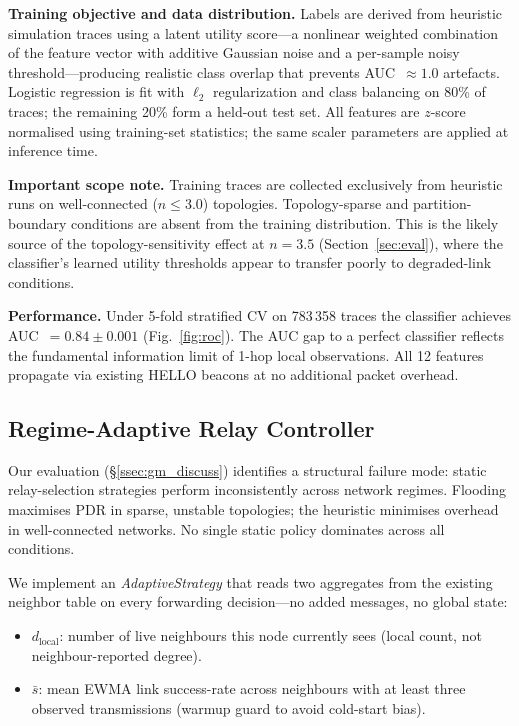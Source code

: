 \documentclass[conference]{IEEEtran}
\begin{document}
\textbf{Training objective and data distribution.}
Labels are derived from heuristic simulation traces using a latent utility
score---a nonlinear weighted combination of the feature vector with additive
Gaussian noise and a per-sample noisy threshold---producing realistic class
overlap that prevents AUC~$\approx 1.0$ artefacts.  Logistic regression is fit
with $\ell_2$ regularization and class balancing on 80\% of traces; the
remaining 20\% form a held-out test set.  All features are $z$-score normalised
using training-set statistics; the same scaler parameters are applied at
inference time.

\textbf{Important scope note.}  Training traces are collected exclusively from
heuristic runs on well-connected ($n \leq 3.0$) topologies.  Topology-sparse
and partition-boundary conditions are absent from the training distribution.
This is the likely source of the topology-sensitivity effect at $n=3.5$
(Section~\ref{sec:eval}), where the classifier's learned utility thresholds
appear to transfer poorly to degraded-link conditions.

\textbf{Performance.}
Under 5-fold stratified CV on 783\,358 traces the classifier achieves
AUC~$=0.84\pm0.001$ (Fig.~\ref{fig:roc}).  The AUC gap to a perfect classifier
reflects the fundamental information limit of 1-hop local observations.
All 12 features propagate via existing HELLO beacons at no additional packet
overhead.

\subsection{Regime-Adaptive Relay Controller}
\label{ssec:adaptive}
Our evaluation (§\ref{ssec:gm_discuss}) identifies a structural failure mode:
static relay-selection strategies perform inconsistently across network regimes.
Flooding maximises PDR in sparse, unstable topologies; the heuristic minimises
overhead in well-connected networks.  No single static policy dominates across
all conditions.

We implement an \emph{AdaptiveStrategy} that reads two aggregates from the
existing neighbor table on every forwarding decision---no added messages, no
global state:

\begin{itemize}
  \item $d_{\text{local}}$: number of live neighbours this node currently sees
        (local count, not neighbour-reported degree).
  \item $\bar{s}$: mean EWMA link success-rate across neighbours with at least
        three observed transmissions (warmup guard to avoid cold-start bias).
\end{itemize}
\end{document}
